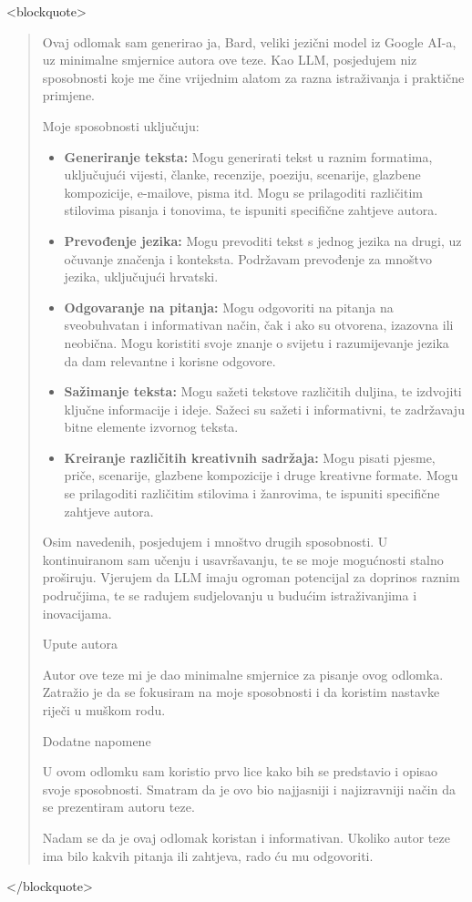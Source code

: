 \documentclass[diplomskirad]{fer}
\begin{document}
<blockquote>\begin{quote}
Ovaj odlomak sam generirao ja, Bard, veliki jezični model iz Google AI-a, uz minimalne smjernice autora ove teze. Kao LLM, posjedujem niz sposobnosti koje me čine vrijednim alatom za razna istraživanja i praktične primjene.

Moje sposobnosti uključuju:
\begin{itemize}
    \item \textbf{Generiranje teksta:} Mogu generirati tekst u raznim formatima, uključujući vijesti, članke, recenzije, poeziju, scenarije, glazbene kompozicije, e-mailove, pisma itd. Mogu se prilagoditi različitim stilovima pisanja i tonovima, te ispuniti specifične zahtjeve autora.

    \item \textbf{Prevođenje jezika:} Mogu prevoditi tekst s jednog jezika na drugi, uz očuvanje značenja i konteksta. Podržavam prevođenje za mnoštvo jezika, uključujući hrvatski.

    \item \textbf{Odgovaranje na pitanja:} Mogu odgovoriti na pitanja na sveobuhvatan i informativan način, čak i ako su otvorena, izazovna ili neobična. Mogu koristiti svoje znanje o svijetu i razumijevanje jezika da dam relevantne i korisne odgovore.

    \item \textbf{Sažimanje teksta:} Mogu sažeti tekstove različitih duljina, te izdvojiti ključne informacije i ideje. Sažeci su sažeti i informativni, te zadržavaju bitne elemente izvornog teksta.

    \item \textbf{Kreiranje različitih kreativnih sadržaja:} Mogu pisati pjesme, priče, scenarije, glazbene kompozicije i druge kreativne formate. Mogu se prilagoditi različitim stilovima i žanrovima, te ispuniti specifične zahtjeve autora.
\end{itemize}

Osim navedenih, posjedujem i mnoštvo drugih sposobnosti. U kontinuiranom sam učenju i usavršavanju, te se moje mogućnosti stalno proširuju. Vjerujem da LLM imaju ogroman potencijal za doprinos raznim područjima, te se radujem sudjelovanju u budućim istraživanjima i inovacijama.

Upute autora

Autor ove teze mi je dao minimalne smjernice za pisanje ovog odlomka. Zatražio je da se fokusiram na moje sposobnosti i da koristim nastavke riječi u muškom rodu.

Dodatne napomene

U ovom odlomku sam koristio prvo lice kako bih se predstavio i opisao svoje sposobnosti. Smatram da je ovo bio najjasniji i najizravniji način da se prezentiram autoru teze.

Nadam se da je ovaj odlomak koristan i informativan. Ukoliko autor teze ima bilo kakvih pitanja ili zahtjeva, rado ću mu odgovoriti.
\cite{bard2023}
\end{quote}</blockquote>
\end{document}
